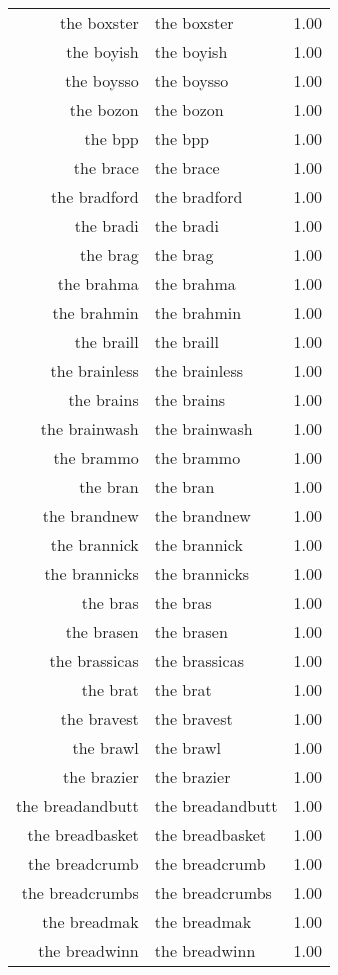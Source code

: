 \begin{table}[ht]
\begin{tabular}{rlr}
  the boxster & the boxster & 1.00 \\ 
  the boyish & the boyish & 1.00 \\ 
  the boysso & the boysso & 1.00 \\ 
  the bozon & the bozon & 1.00 \\ 
  the bpp & the bpp & 1.00 \\ 
  the brace & the brace & 1.00 \\ 
  the bradford & the bradford & 1.00 \\ 
  the bradi & the bradi & 1.00 \\ 
  the brag & the brag & 1.00 \\ 
  the brahma & the brahma & 1.00 \\ 
  the brahmin & the brahmin & 1.00 \\ 
  the braill & the braill & 1.00 \\ 
  the brainless & the brainless & 1.00 \\ 
  the brains & the brains & 1.00 \\ 
  the brainwash & the brainwash & 1.00 \\ 
  the brammo & the brammo & 1.00 \\ 
  the bran & the bran & 1.00 \\ 
  the brandnew & the brandnew & 1.00 \\ 
  the brannick & the brannick & 1.00 \\ 
  the brannicks & the brannicks & 1.00 \\ 
  the bras & the bras & 1.00 \\ 
  the brasen & the brasen & 1.00 \\ 
  the brassicas & the brassicas & 1.00 \\ 
  the brat & the brat & 1.00 \\ 
  the bravest & the bravest & 1.00 \\ 
  the brawl & the brawl & 1.00 \\ 
  the brazier & the brazier & 1.00 \\ 
  the breadandbutt & the breadandbutt & 1.00 \\ 
  the breadbasket & the breadbasket & 1.00 \\ 
  the breadcrumb & the breadcrumb & 1.00 \\ 
  the breadcrumbs & the breadcrumbs & 1.00 \\ 
  the breadmak & the breadmak & 1.00 \\ 
  the breadwinn & the breadwinn & 1.00 \\ 

\end{tabular}
\end{table}
